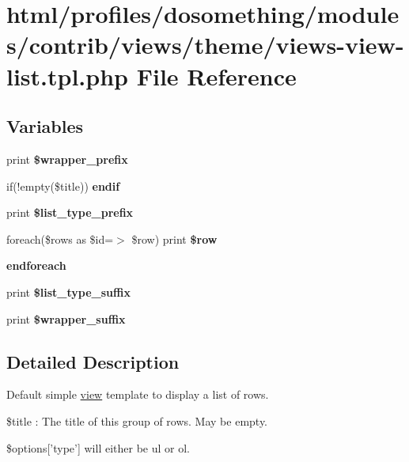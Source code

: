 \hypertarget{views-view-list_8tpl_8php}{
\section{html/profiles/dosomething/modules/contrib/views/theme/views-\/view-\/list.tpl.php File Reference}
\label{views-view-list_8tpl_8php}
}
\subsection*{Variables}
\begin{DoxyCompactItemize}
\item 
\hypertarget{views-view-list_8tpl_8php_ae335f3127484561ec8234df407bd1c5a}{
print {\bfseries \$wrapper\_\-prefix}}
\label{views-view-list_8tpl_8php_ae335f3127484561ec8234df407bd1c5a}

\item 
\hypertarget{views-view-list_8tpl_8php_ade91bc69a503a5ab88f3fdb968225b63}{
if(!empty(\$title)) {\bfseries endif}}
\label{views-view-list_8tpl_8php_ade91bc69a503a5ab88f3fdb968225b63}

\item 
\hypertarget{views-view-list_8tpl_8php_aeca3572012ef780fc01c828ea1fe8e8b}{
print {\bfseries \$list\_\-type\_\-prefix}}
\label{views-view-list_8tpl_8php_aeca3572012ef780fc01c828ea1fe8e8b}

\item 
\hypertarget{views-view-list_8tpl_8php_af50a7f2d493c1886630359887894e53e}{
foreach(\$rows as \$id=$>$ \$row) print {\bfseries \$row}}
\label{views-view-list_8tpl_8php_af50a7f2d493c1886630359887894e53e}

\item 
\hypertarget{views-view-list_8tpl_8php_a672d9707ef91db026c210f98cc601123}{
{\bfseries endforeach}}
\label{views-view-list_8tpl_8php_a672d9707ef91db026c210f98cc601123}

\item 
\hypertarget{views-view-list_8tpl_8php_aeac6912660cccae27a4a7c5339b6dfd4}{
print {\bfseries \$list\_\-type\_\-suffix}}
\label{views-view-list_8tpl_8php_aeac6912660cccae27a4a7c5339b6dfd4}

\item 
\hypertarget{views-view-list_8tpl_8php_a518d54474976ade540852f7fb8e0892e}{
print {\bfseries \$wrapper\_\-suffix}}
\label{views-view-list_8tpl_8php_a518d54474976ade540852f7fb8e0892e}

\end{DoxyCompactItemize}


\subsection{Detailed Description}
Default simple \hyperlink{classview}{view} template to display a list of rows.


\begin{DoxyItemize}
\item \$title : The title of this group of rows. May be empty.
\item \$options\mbox{[}'type'\mbox{]} will either be ul or ol. 
\end{DoxyItemize}